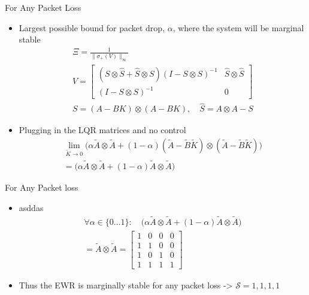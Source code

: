\begin{frame}{For Any Packet Loss}
	\begin{itemize}
		\item Largest possible bound for packet drop, $ \alpha $, where the system will be marginal stable
		\begin{equation}\label{eq:VMatrix}
			\begin{gathered}
				\Xi = \frac{1}{\lVert\sigma_+(V)\rVert_\infty} \\
				V = \begin{bmatrix} (S\otimes\hat{S}+\hat{S} \otimes S)(I - S\otimes S)^{-1} & \hat{S}\otimes\hat{S} \\ (I - S\otimes S)^{-1} & 0 \end{bmatrix} \\
				S = \left(A-BK\right) \otimes \left(A-BK\right), \quad \hat{S} = A \otimes A - S
			\end{gathered}
		\end{equation}
		\item Plugging in the LQR matrices and no control
		\begin{equation}
			\begin{split}
				\lim_{\tilde{K}\rightarrow 0} \Big(\alpha \tilde{A} \otimes \tilde{A} + (1-\alpha)(\tilde{A}-\tilde{B}\tilde{K}) \otimes (\tilde{A}-\tilde{B}\tilde{K}) \Big) \\
				= \Big(\alpha \tilde{A} \otimes \tilde{A} + (1-\alpha)\tilde{A} \otimes \tilde{A}\Big)	
			\end{split}
		\end{equation}
	\end{itemize}
\end{frame}	

\begin{frame}{For Any Packet loss}
	\begin{itemize}
		\item asddas
		\begin{equation}
			\begin{split}
				\forall \alpha \in \{0 \dots 1\}: \quad \Big(\alpha \tilde{A} \otimes \tilde{A} + (1-\alpha)\tilde{A} \otimes \tilde{A}\Big) \\
				= \tilde{A}\otimes\tilde{A} 
				= \begin{bmatrix}  
					1 & 0 & 0 & 0 \\
					1 & 1 & 0 & 0 \\
					1 & 0 & 1 & 0 \\
					1 & 1 & 1 & 1	
				\end{bmatrix}
			\end{split}
		\end{equation}
		\item Thus the EWR is marginally stable for any packet loss -> $ \mathcal{S}={1, 1, 1, 1}  $
	\end{itemize}
\end{frame}

